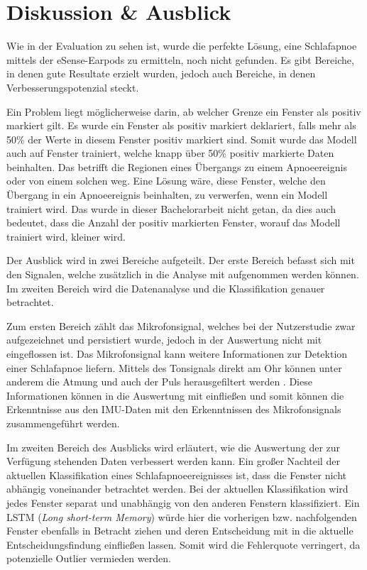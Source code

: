 
\chapter{Diskussion \& Ausblick}
\label{ch:FutureWork}
%

Wie in der Evaluation zu sehen ist, wurde die perfekte Lösung, eine Schlafapnoe mittels der eSense-Earpods zu ermitteln, noch nicht gefunden.
Es gibt Bereiche, in denen gute Resultate erzielt wurden, jedoch auch Bereiche, in denen Verbesserungspotenzial steckt. 

Ein Problem liegt möglicherweise darin, ab welcher Grenze ein Fenster als positiv markiert gilt.
Es wurde ein Fenster als positiv markiert deklariert, falls mehr als 50\% der Werte in diesem Fenster positiv markiert sind.
Somit wurde das Modell auch auf Fenster trainiert, welche knapp über 50\% positiv markierte Daten beinhalten.
Das betrifft die Regionen eines Übergangs zu einem Apnoeereignis oder von einem solchen weg.
Eine Lösung wäre, diese Fenster, welche den Übergang in ein Apnoeereignis beinhalten, zu verwerfen, wenn ein Modell trainiert wird. 
Das wurde in dieser Bachelorarbeit nicht getan, da dies auch bedeutet, dass die Anzahl der positiv markierten Fenster, worauf das Modell trainiert wird, kleiner wird.

Der Ausblick wird in zwei Bereiche aufgeteilt.
Der erste Bereich befasst sich mit den Signalen, welche zusätzlich in die Analyse mit aufgenommen werden können.
Im zweiten Bereich wird die Datenanalyse und die Klassifikation genauer betrachtet.

Zum ersten Bereich zählt das Mikrofonsignal, welches bei der Nutzerstudie zwar aufgezeichnet und persistiert wurde, jedoch in der Auswertung nicht mit eingeflossen ist. 
Das Mikrofonsignal kann weitere Informationen zur Detektion einer Schlafapnoe liefern. 
Mittels des Tonsignals direkt am Ohr können unter anderem die Atmung und auch der Puls herausgefiltert werden \cite{nomaWearableDataAcquisition2005}.
Diese Informationen können in die Auswertung mit einfließen und somit können die Erkenntnisse aus den IMU-Daten mit den Erkenntnissen des Mikrofonsignals zusammengeführt werden.

Im zweiten Bereich des Ausblicks wird erläutert, wie die Auswertung der zur Verfügung stehenden Daten verbessert werden kann.
Ein großer Nachteil der aktuellen Klassifikation eines Schlafapnoeereignisses ist, dass die Fenster nicht abhängig voneinander betrachtet werden.
Bei der aktuellen Klassifikation wird jedes Fenster separat und unabhängig von den anderen Fenstern klassifiziert.
Ein LSTM (\textit{Long short-term Memory}) würde hier die vorherigen bzw. nachfolgenden Fenster ebenfalls in Betracht ziehen und deren Entscheidung mit in die aktuelle Entscheidungsfindung einfließen lassen. 
Somit wird die Fehlerquote verringert, da potenzielle Outlier vermieden werden.


